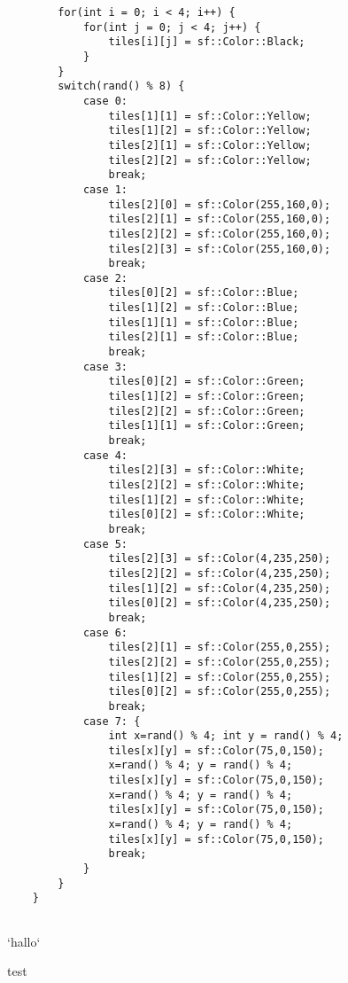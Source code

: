 \documentclass[11pt]{amsart}
\begin{document}
\begin{verbatim}
	    for(int i = 0; i < 4; i++) {
	        for(int j = 0; j < 4; j++) {
	            tiles[i][j] = sf::Color::Black;
	        }
	    }
	    switch(rand() % 8) {
	        case 0:
	            tiles[1][1] = sf::Color::Yellow;
	            tiles[1][2] = sf::Color::Yellow;
	            tiles[2][1] = sf::Color::Yellow;
	            tiles[2][2] = sf::Color::Yellow;
	            break;
	        case 1:
	            tiles[2][0] = sf::Color(255,160,0);
	            tiles[2][1] = sf::Color(255,160,0);
	            tiles[2][2] = sf::Color(255,160,0);
	            tiles[2][3] = sf::Color(255,160,0);
	            break;
	        case 2:
	            tiles[0][2] = sf::Color::Blue;
	            tiles[1][2] = sf::Color::Blue;
	            tiles[1][1] = sf::Color::Blue;
	            tiles[2][1] = sf::Color::Blue;
	            break;
	        case 3:
	            tiles[0][2] = sf::Color::Green;
	            tiles[1][2] = sf::Color::Green;
	            tiles[2][2] = sf::Color::Green;
	            tiles[1][1] = sf::Color::Green;
	            break;
	        case 4:
	            tiles[2][3] = sf::Color::White;
	            tiles[2][2] = sf::Color::White;
	            tiles[1][2] = sf::Color::White;
	            tiles[0][2] = sf::Color::White;
	            break;
	        case 5:
	            tiles[2][3] = sf::Color(4,235,250);
	            tiles[2][2] = sf::Color(4,235,250);
	            tiles[1][2] = sf::Color(4,235,250);
	            tiles[0][2] = sf::Color(4,235,250);
	            break;
	        case 6:
	            tiles[2][1] = sf::Color(255,0,255);
	            tiles[2][2] = sf::Color(255,0,255);
	            tiles[1][2] = sf::Color(255,0,255);
	            tiles[0][2] = sf::Color(255,0,255);
	            break;
	        case 7: {
	            int x=rand() % 4; int y = rand() % 4;
	            tiles[x][y] = sf::Color(75,0,150);
	            x=rand() % 4; y = rand() % 4;
	            tiles[x][y] = sf::Color(75,0,150);
	            x=rand() % 4; y = rand() % 4;
	            tiles[x][y] = sf::Color(75,0,150);
	            x=rand() % 4; y = rand() % 4;
	            tiles[x][y] = sf::Color(75,0,150);
	            break;
	        }
	    }
	}


\end{verbatim}



`hallo`



test
\end{document}

